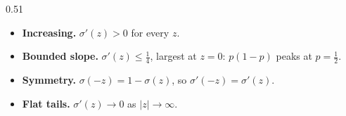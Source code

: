 \documentclass[12pt]{beamer}
\begin{document}
\begin{frame}
\begin{columns}[c]
\begin{column}{0.51\textwidth}
\begin{itemize}
                \item \textbf{Increasing.} $\sigma'(z) > 0$ for every $z$.
                \item \textbf{Bounded slope.} $\sigma'(z) \le \tfrac14$, largest
                      at $z = 0$: $p(1-p)$ peaks at $p = \tfrac12$.
                \item \textbf{Symmetry.} $\sigma(-z) = 1-\sigma(z)$, so
                      $\sigma'(-z) = \sigma'(z)$.
                \item \textbf{Flat tails.} $\sigma'(z) \to 0$ as
                      $|z| \to \infty$.
            \end{itemize}
        \end{column}
    \end{columns}
\end{frame}
\end{document}
